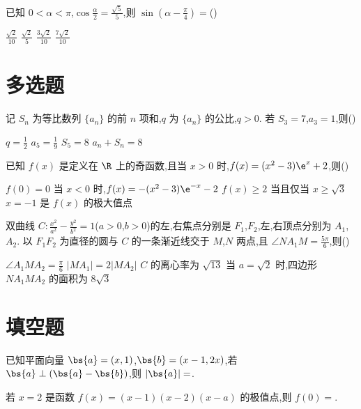 \begin{problem}
已知 \(0<\alpha<\pi\),\(\cos \frac{\alpha}{2}=\frac{\sqrt5}{5}\),则 \(\sin\left(\alpha-\frac{\pi}{4}\right)=\)(\quad)

\choices
    {\(\frac{\sqrt2}{10}\)}
    {\(\frac{\sqrt2}{5}\)}
    {\(\frac{3\sqrt2}{10}\)}
    {\(\frac{7\sqrt2}{10}\)}
\end{problem}

\section{多选题}

\begin{problem}
记 \(S_n\) 为等比数列 \(\{a_n\}\) 的前 \(n\) 项和,\(q\) 为 \(\{a_n\}\) 的公比,\(q>0\). 若 \(S_3=7\),\(a_3=1\),则(\quad)

\choices
    {\(q=\frac12\)}
    {\(a_5=\frac19\)}
    {\(S_5=8\)}
    {\(a_n+S_n=8\)}
\end{problem}

\begin{problem}
已知 \(f(x)\) 是定义在 \(\R\) 上的奇函数,且当 \(x>0\) 时,\(f(x)=(x^2-3)\e^x+2\),则(\quad)

\choices
    {\(f(0)=0\)}
    {当 \(x<0\) 时,\(f(x)=-(x^2-3)\e^{-x}-2\)}
    {\(f(x)\ge 2\) 当且仅当 \(x\ge \sqrt3\)}
    {\(x=-1\) 是 \(f(x)\) 的极大值点}
\end{problem}

\begin{problem}
双曲线 \(C:\frac{x^2}{a^2}-\frac{y^2}{b^2}=1\)(\(a>0\),\(b>0\))的左,右焦点分别是 \(F_1\),\(F_2\),左,右顶点分别为 \(A_1\),\(A_2\). 以 \(F_1F_2\) 为直径的圆与 \(C\) 的一条渐近线交于 \(M\),\(N\) 两点,且 \(\angle NA_1M=\frac{5\pi}{6}\),则(\quad)

\choices
    {\(\angle A_1MA_2=\frac{\pi}{6}\)}
    {\(|MA_1|=2|MA_2|\)}
    {\(C\) 的离心率为 \(\sqrt{13}\)}
    {当 \(a=\sqrt2\) 时,四边形 \(NA_1MA_2\) 的面积为 \(8\sqrt3\)}
\end{problem}

\section{填空题}

\begin{problem}
已知平面向量 \(\bs{a}=(x,1)\),\(\bs{b}=(x-1,2x)\),若 \(\bs{a}\perp(\bs{a}-\bs{b})\),则 \(|\bs{a}|=\)\fillinblank{}.
\end{problem}

\begin{problem}
若 \(x=2\) 是函数 \(f(x)=(x-1)(x-2)(x-a)\) 的极值点,则 \(f(0)=\)\fillinblank{}.
\end{problem}

